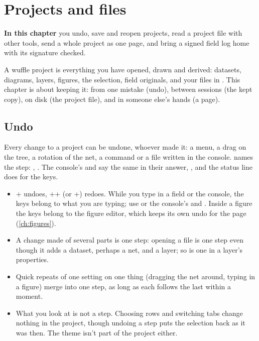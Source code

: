 \chapter{Projects and files}\label{ch:projects}
\begin{goals}
\textbf{In this chapter} you undo, save and reopen projects, read a project file with other tools, send a
whole project as one page, and bring a signed field log home with its signature checked.
\end{goals}

A wuffle project is everything you have opened, drawn and derived: datasets, diagrams, layers, figures,
the selection, field originals, and your files in . This chapter is about keeping it: from one
mistake (undo), between sessions (the kept copy), on disk (the project file), and in someone else's hands
(a page).

\section{Undo}\label{sec:undo}


Every change to a project can be undone, whoever made it: a menu, a drag on the tree, a rotation of the
net, a command or a file written in the console.  names the step: , . The console's  and  say the same in their answer,
, and the status line does for the keys.

\begin{itemize}
\item {}+ undoes, ++ (or +) redoes. While you
type in a field or the console, the keys belong to what you are typing; use  or the console's
 and . Inside a figure the keys belong to the figure editor, which keeps its own
undo for the page (\cref{ch:figures}).
\item A change made of several parts is one step: opening a file is one step even though it adds a
dataset, perhaps a net, and a layer; so is one  in a layer's properties.
\item Quick repeats of one setting on one thing (dragging the net around, typing in a figure) merge into
one step, as long as each follows the last within a moment.
\item What you look at is not a step. Choosing rows and switching tabs change nothing in the project,
though undoing a step puts the selection back as it was then. The theme isn't part of the project either.
\end{itemize}

